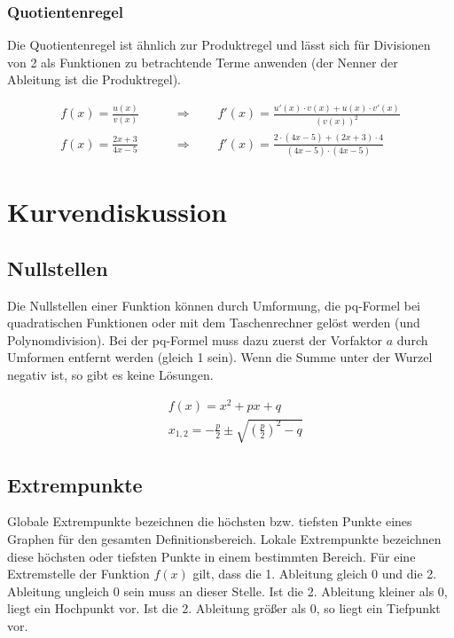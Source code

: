 \subsubsection{Quotientenregel}

Die Quotientenregel ist ähnlich zur Produktregel und lässt sich für Divisionen von 2 als
Funktionen zu betrachtende Terme anwenden (der Nenner der Ableitung ist die Produktregel).

\begin{align*}
    f(x) = \frac{u(x)}{v(x)} \qquad & \Rightarrow \qquad f'(x) = \frac{u'(x) \cdot v(x) + u(x) \cdot v'(x)}{(v(x))^2} \\[15pt]
    f(x) = \frac{2x + 3}{4x - 5} \qquad & \Rightarrow \qquad f'(x) = \frac{2 \cdot (4x - 5) + (2x + 3) \cdot 4}{(4x - 5) \cdot (4x - 5)}
\end{align*}

\section{Kurvendiskussion}

\subsection{Nullstellen}

Die Nullstellen einer Funktion können durch Umformung, die pq-Formel bei quadratischen Funktionen oder
mit dem Taschenrechner gelöst werden (und Polynomdivision).
Bei der pq-Formel muss dazu zuerst der Vorfaktor $a$ durch Umformen entfernt werden
(gleich 1 sein). Wenn die Summe unter der Wurzel negativ ist, so gibt es keine Lösungen.

\begin{align*}
    & f(x) = x^2 + px +q \\[10pt]
    & x_{1,2} = -\frac{p}{2} \pm \sqrt{(\frac{p}{2})^2 - q}
\end{align*}

\subsection{Extrempunkte}

Globale Extrempunkte bezeichnen die höchsten bzw. tiefsten Punkte eines Graphen für den
gesamten Definitionsbereich. Lokale Extrempunkte bezeichnen diese höchsten oder tiefsten
Punkte in einem bestimmten Bereich.
Für eine Extremstelle der Funktion $f(x)$ gilt, dass die 1. Ableitung gleich 0 und die 2.
Ableitung ungleich 0 sein muss an dieser Stelle.
Ist die 2. Ableitung kleiner als 0, liegt ein Hochpunkt vor.
Ist die 2. Ableitung größer als 0, so liegt ein Tiefpunkt vor.

